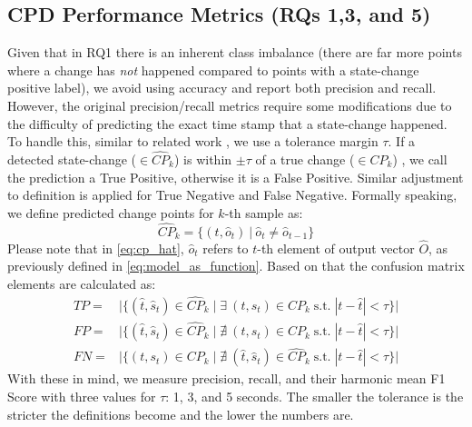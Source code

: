 \subsection{CPD Performance Metrics (RQs 1,3, and 5)} \label{sec:CPD_metrics}
Given that in RQ1 there is an inherent class imbalance (there are far more points where a change has \textit{not} happened compared to points with a state-change positive label), we avoid using accuracy and report both precision and recall. %
However, the original precision/recall metrics require some modifications due to the difficulty of predicting the exact time stamp that a state-change happened. To handle this, similar to related work \cite{Truong2018ChangePointSurvey}, we use a tolerance margin $\tau$. If a detected state-change ($\in\hat{CP}_k$) is within $\pm\tau$ of a true change ($\in{CP}_k$) , we call the prediction a True Positive, otherwise it is a False Positive. Similar adjustment to definition is applied for True Negative and False Negative. 
Formally speaking, we define predicted change points for $k$-th sample as:
\begin{equation} \label{eq:cp_hat}
\hat{CP}_k = \big\{(t, \hat{o}_t)\: |\: \hat{o}_t \neq \hat{o}_{t-1} \big\}
\end{equation}
Please note that in \eqref{eq:cp_hat}, $\hat{o}_t$ refers to $t$-th element of output vector $\hat{O}$, as previously defined in \eqref{eq:model_as_function}. Based on that the confusion matrix elements are calculated as:
\begin{equation} \label{eq:metrics}
\begin{split}
TP ={}&{}\Big|\big\{ (\hat{t}, \hat{s}_t) \in \hat{CP}_k \;\big|\; \exists\: (t, s_t) \in CP_k \;\text{s.t.}\; |t - \hat{t}| < \tau\big\}\Big| \\
FP ={}&{}\Big|\big\{ (\hat{t}, \hat{s}_t) \in \hat{CP}_k \;\big|\; \nexists\: (t, s_t) \in CP_k \;\text{s.t.}\; |t - \hat{t}| < \tau\big\}\Big| \\
FN ={}&{}\Big|\big\{ (t, s_t) \in CP_k \;\big|\; \nexists\: (\hat{t}, \hat{s}_t) \in \hat{CP}_k \;\text{s.t.}\; |t - \hat{t}| < \tau\big\}\Big| 
\end{split}
\end{equation}
With these in mind, we measure precision, recall, and their harmonic mean F1 Score with three values for $\tau$: 1, 3, and 5 seconds. The smaller the tolerance is the stricter the definitions become and the lower the numbers are. 

